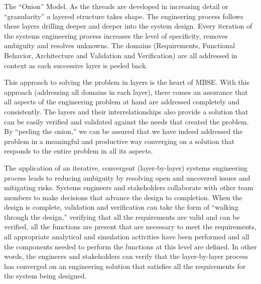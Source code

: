 The ``Onion'' Model. As the threads are developed in increasing detail or ``granularity'' a layered structure takes shape. The engineering process follows these layers drilling deeper and deeper into the system design. Every iteration of the systems engineering process increases the level of specificity, removes ambiguity and resolves unknowns. The domains (Requirements, Functional Behavior, Architecture and Validation and Verification) are all addressed in context as each successive layer is peeled back. 

This approach to solving the problem in layers is the heart of MBSE. With this approach (addressing all domains in each layer), there comes an assurance that all aspects of the engineering problem at hand are addressed completely and consistently. The layers and their interrelationships also provide a solution that can be easily verified and validated against the needs that created the problem. By ``peeling the onion,'' we can be assured that we have indeed addressed the problem in a meaningful and productive way converging on a solution that responds to the entire problem in all its aspects.

The application of an iterative, convergent (layer-by-layer) systems engineering process leads to reducing ambiguity by resolving open and uncovered issues and mitigating risks. Systems engineers and stakeholders collaborate with other team members to make decisions that advance the design to completion. When the design is complete, validation and verification can take the form of ``walking through the design,'' verifying that all the requirements are valid and can be verified, all the functions are present that are necessary to meet the requirements, all appropriate analytical and simulation activities have been performed and all the components needed to perform the functions at this level are defined. In other words, the engineers and stakeholders can verify that the layer-by-layer process has converged on an engineering solution that satisfies all the requirements for the system being designed.